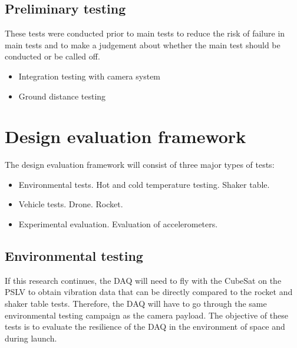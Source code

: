 \documentclass[a4paper,11pt]{article}
\begin{document}

\subsection{Preliminary testing}

These tests were conducted prior to main tests to reduce the risk of failure in main tests and to make a judgement about whether the main test should be conducted or be called off.

\begin{itemize}
  \item Integration testing with camera system %
  \item Ground distance testing %
\end{itemize}

\section{Design evaluation framework}

The design evaluation framework will consist of three major types of tests:

\begin{itemize}
  \item Environmental tests.
        \subitem Hot and cold temperature testing.
        \subitem Shaker table.
  \item Vehicle tests.
        \subitem Drone.
        \subitem Rocket.
  \item Experimental evaluation.
        \subitem Evaluation of accelerometers.
\end{itemize}

\subsection{Environmental testing}

If this research continues, the DAQ will need to fly with the CubeSat on the PSLV to obtain vibration data that can be directly compared to the rocket and shaker table tests. Therefore, the DAQ will have to go through the same environmental testing campaign as the camera payload. The objective of these tests is to evaluate the resilience of the DAQ in the environment of space and during launch.
\end{document}
